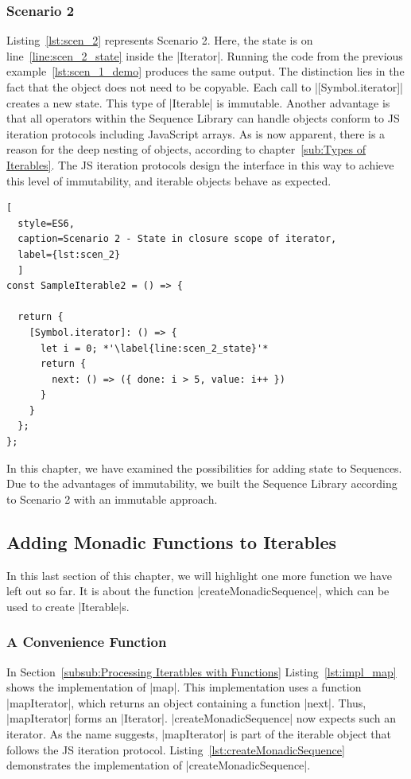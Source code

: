 \subsubsection{Scenario 2}
Listing~\ref{lst:scen_2} represents Scenario 2. Here, the state is on
line~\ref{line:scen_2_state} inside the |Iterator|. Running the code from the previous 
example~\ref{lst:scen_1_demo} produces the same output. The distinction lies in
the fact that the object does not need to be copyable. Each call to |[Symbol.iterator]| 
creates a new state. This type of |Iterable| is immutable. Another advantage is
that all operators within the Sequence Library can handle objects conform to JS
iteration protocols including JavaScript arrays.
\newline
As is now apparent, there is a reason for the deep nesting of objects, according 
to chapter~\ref{sub:Types of Iterables}. The JS iteration protocols design the 
interface in this way to achieve this level of immutability, and iterable 
objects behave as expected.

\begin{lstlisting}[
  style=ES6, 
  caption=Scenario 2 - State in closure scope of iterator,
  label={lst:scen_2}
  ]
const SampleIterable2 = () => {

  return {
    [Symbol.iterator]: () => {
      let i = 0; *'\label{line:scen_2_state}'*
      return {
        next: () => ({ done: i > 5, value: i++ })
      }
    }
  };
};
\end{lstlisting}

In this chapter, we have examined the possibilities for adding state to 
Sequences. Due to the advantages of immutability, we built the Sequence Library 
according to Scenario 2 with an immutable approach.


\subsection{Adding Monadic Functions to Iterables}
\label{sub:Adding Monadic Functions to Iterables}
In this last section of this chapter, we will highlight one more function we 
have left out so far. It is about the function |createMonadicSequence|, which
can be used to create |Iterable|s.

\subsubsection{A Convenience Function}
\label{subsub:A Convenience Function}
In Section~\ref{subsub:Processing Iteratbles with Functions} 
Listing~\ref{lst:impl_map} shows the implementation of |map|. 
This implementation uses a function |mapIterator|, which returns an object
containing a function |next|. Thus, |mapIterator| forms an |Iterator|.
|createMonadicSequence| now expects such an iterator. As the name suggests, 
|mapIterator| is part of the 
iterable object that follows the JS iteration protocol.
Listing~\ref{lst:createMonadicSequence} demonstrates the implementation of 
|createMonadicSequence|.

